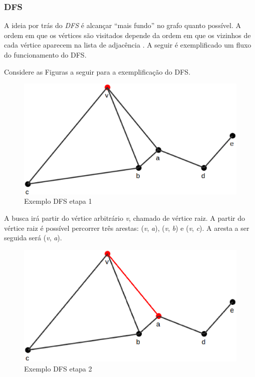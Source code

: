 \subsubsection{DFS}
\label{subsec:dfs}

A ideia por trás do \textit{DFS} é alcançar ``mais fundo'' no grafo quanto possível. A ordem em que os vértices são visitados depende da ordem em que os vizinhos de cada vértice aparecem na lista de adjacência \cite{Cormen:2001}. A seguir é exemplificado um fluxo do funcionamento do DFS.

Considere as Figuras a seguir para a exemplificação do DFS.

\begin{figure}[!h]
	\centering
	\includegraphics[scale=0.25]{figuras/capitulo2/dfs/dfs1.eps}
	\caption[Exemplo DFS etapa 1]{Exemplo DFS etapa 1 \cite{Cormen:2001}}
	\label{dfs1}
\end{figure}

A busca irá partir do vértice arbitrário \textit{v}, chamado de vértice raiz. A partir do vértice raiz é possível percorrer três arestas: (\textit{v}, \textit{a}), (\textit{v}, \textit{b}) e (\textit{v}, \textit{c}). A aresta a ser seguida será (\textit{v}, \textit{a}).

\begin{figure}[!h]
	\centering
	\includegraphics[scale=0.25]{figuras/capitulo2/dfs/dfs2.eps}
	\caption[Exemplo DFS etapa 2]{Exemplo DFS etapa 2 \cite{Cormen:2001}}
	\label{dfs2}
\end{figure}

